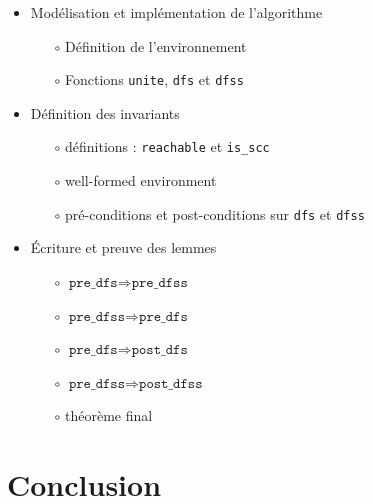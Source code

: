\documentclass{beamer}
\theoremstyle{definition}
\begin{document}
\begin{frame}
    \begin{itemize}
        \item Modélisation et implémentation de l'algorithme
        \begin{itemize}
            \item[$\circ$] Définition de l'environnement
            \item[$\circ$] Fonctions \texttt{unite}, \texttt{dfs} et \texttt{dfss}
        \end{itemize}
        \vfill
        \item Définition des invariants
        \begin{itemize}
          \item[$\circ$] définitions : \texttt{reachable} et \texttt{is\_scc}
          \item[$\circ$] well-formed environment
          \item[$\circ$] pré-conditions et post-conditions sur \texttt{dfs} et \texttt{dfss}
        \end{itemize}
        \vfill
        \item Écriture et preuve des lemmes
        \begin{itemize}
            \item[$\circ$] $\texttt{pre\_dfs} \Longrightarrow \texttt{pre\_dfss}$
            \item[$\circ$] $\texttt{pre\_dfss} \Longrightarrow \texttt{pre\_dfs}$
            \item[$\circ$] $\texttt{pre\_dfs} \Longrightarrow \texttt{post\_dfs}$
            \item[$\circ$] $\texttt{pre\_dfss} \Longrightarrow \texttt{post\_dfss}$
            \item[$\circ$] théorème final
        \end{itemize}
    \end{itemize}    
\end{frame}

\section{Conclusion}
\begin{frame}
    \tableofcontents[currentsection]
\end{frame}
\end{document}

